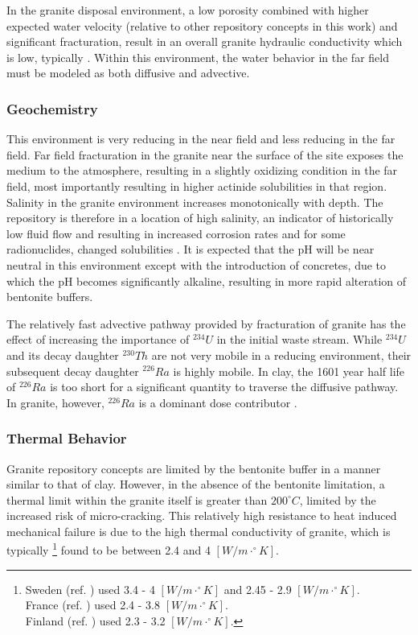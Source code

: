 In the granite disposal environment, a low porosity combined with 
higher expected water velocity (relative to other repository concepts in this 
work) and significant fracturation, result in an overall 
granite hydraulic conductivity which is low, typically
\cite{schwartz_fundamentals_2004, 
hardin_generic_2011}. Within this environment, the  
water behavior in the far field must be modeled as both diffusive and advective.

\subsubsection{Geochemistry}

This environment is very reducing in the near field and less reducing in the 
far field. Far field fracturation in the granite near the surface of the site 
exposes the medium to the atmosphere, resulting in a slightly oxidizing 
condition in the far field, most importantly resulting in higher actinide 
solubilities in that region. Salinity in the granite environment increases 
monotonically with depth. The repository is therefore in a location of high 
salinity, an indicator of historically low fluid flow and resulting in increased corrosion 
rates and for some radionuclides, changed solubilities \cite{argile_granite:_2005}.
It is expected that the pH will be near neutral in this environment except with  
the introduction of concretes, due to which the pH becomes significantly 
alkaline, resulting in more rapid alteration of bentonite buffers. 

The relatively fast advective pathway provided by fracturation of granite 
has the effect of increasing the importance of $^{234}U$ in the initial waste 
stream. While $^{234}U$ and its decay daughter $^{230}Th$ are not very mobile 
in a reducing environment, their subsequent decay daughter $^{226}Ra$ is highly 
mobile. In clay, the 1601 year half life of $^{226}Ra$ is too short for a 
significant quantity to traverse the diffusive pathway. In granite, however,  
$^{226}Ra$ is a dominant dose contributor \cite{swift_applying_2010}. 

\subsubsection{Thermal Behavior}
\label{subsec:granitethermal}

Granite repository concepts are limited by the bentonite buffer in a manner 
similar to that of clay. However, in the absence of the bentonite limitation, a 
thermal limit within the granite itself is greater than $200^{\circ}C$, limited 
by the increased risk of micro-cracking. This relatively high resistance to heat  
induced mechanical failure is due to the high thermal conductivity of granite, which is 
typically 
\footnote{
Sweden (ref. \cite{ab_long-term_2006}) used 3.4 - 4 $[W/m\cdot^{\circ}K]$ and 2.45 - 2.9 $[W/m\cdot^{\circ}K]$.\\
France (ref. \cite{andra_argile:_2005}) used 2.4 - 3.8 $[W/m\cdot^{\circ}K]$.\\
Finland (ref. \cite{posiva_interim_2010}) used 2.3 - 3.2 $[W/m\cdot^{\circ}K]$. 
}
found to be between 2.4 and 4 $[W/m\cdot^{\circ}K]$. 

